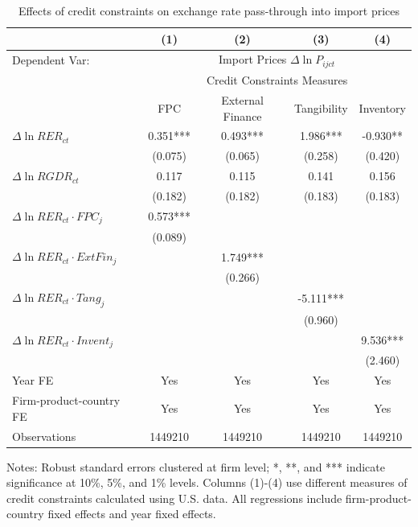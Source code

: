 \begin{table}[htb]
	\centering
	\caption{Effects of credit constraints on exchange rate pass-through into import prices}
	\begin{threeparttable}	
		\begin{tabular}{lcccc}
			\toprule
			& (1)   & (2)   & (3)   & (4) \\
			\midrule
                Dependent Var: & \multicolumn{4}{c}{ Import Prices $\Delta \ln P_{ijct}$} \\
			 & \multicolumn{4}{c}{Credit Constraints Measures} \\
			& FPC   & External Finance & Tangibility & Inventory \\
			\midrule
			$\Delta \ln RER_{ct}$ & 0.351*** & 0.493*** & 1.986*** & -0.930** \\
			& (0.075) & (0.065) & (0.258) & (0.420) \\
			$\Delta \ln RGDR_{ct}$ & 0.117 & 0.115 & 0.141 & 0.156 \\
			& (0.182) & (0.182) & (0.183) & (0.183) \\
			$\Delta \ln RER_{ct} \cdot FPC_{j}$ & 0.573*** &       &       &  \\
			& (0.089) &       &       &  \\
			$\Delta \ln RER_{ct} \cdot ExtFin_{j}$ &    & 1.749*** &       &  \\
			&   & (0.266) &       &  \\
			$\Delta \ln RER_{ct} \cdot Tang_{j}$ &   &       & -5.111*** &  \\
			&   &       & (0.960) &  \\
			$\Delta \ln RER_{ct} \cdot Invent_{j}$ &    &       &       & 9.536*** \\
			&   &       &       & (2.460) \\
                \midrule
			Year FE  & Yes   & Yes   & Yes   & Yes \\
			Firm-product-country FE & Yes   & Yes   & Yes   & Yes \\
			Observations & 1449210 & 1449210 & 1449210 & 1449210 \\
			\bottomrule
		\end{tabular}
		\begin{tablenotes}
			\footnotesize
			\item Notes: Robust standard errors clustered at firm level;  *, **, and *** indicate significance at 10\%, 5\%, and 1\% levels. Columns (1)-(4) use different measures of credit constraints calculated using U.S. data. All regressions include firm-product-country fixed effects and year fixed effects.
		\end{tablenotes}
	\end{threeparttable}
	\label{tab.credit}
\end{table}

